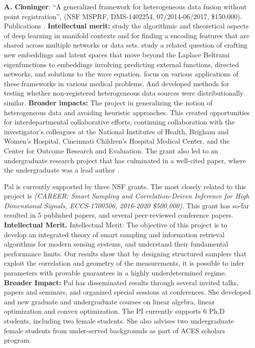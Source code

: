 {\bf A. Cloninger}: ``A generalized framework for heterogeneous data fusion without point registration'', (NSF MSPRF, DMS-1402254, 07/2014-06/2017, \$150,000). Publications \cite{mishne2017diffusion,cloninger2018bigeometric,shaham2018provable,cloninger2017spectral, cloninger2017note, cloninger2017prediction,cloninger2016function, downing2017describing, bates2017outcome, katzman2018deepsurv,cheng2017two,cloninger2018people}.
{\bf Intellectual merit:} \cite{mishne2017diffusion,cloninger2018bigeometric,shaham2018provable} study the algorithmic and theoretical aspects of deep learning in manifold contexts and for finding a encoding features that are shared across multiple networks or data sets.  \cite{cloninger2017spectral, cloninger2017note, cloninger2017prediction} study a related question of crafting new embeddings and latent spaces that move beyond the Laplace Beltrami eigenfunctions to embeddings involving predicting external functions, directed networks, and solutions to the wave equation.%
\cite{cloninger2016function, downing2017describing, bates2017outcome, katzman2018deepsurv} focus on various applications of these frameworks in various medical problems.  And \cite{cheng2017two,cloninger2018people} developed methods for testing whether non-registered heterogeneous data sources were distributionally similar.
{\bf Broader impacts:}
The project in generalizing the notion of heterogeneous data and avoiding heuristic approaches.  This created opportunities for interdepartmental collaborative efforts, continuing collaboration with the investigator's colleagues at the National Institutes of Health, Brigham and Women's Hospital, Cincinnati Children's Hospital Medical Center, and the Center for Outcome Research and Evaluation.  The grant also led to an undergraduate research project that has culminated in a well-cited paper, where the undergraduate was a lead author \cite{katzman2018deepsurv}.


 Pal is currently supported by three NSF grants. The most closely related to this project is {\em  (CAREER: Smart Sampling and Correlation-Driven Inference for High Dimensional Signals, ECCS-1700506, 2016-2020 \$500,000)}. This grant has so-far resulted in 5 published papers, and several peer-reviewed conference papers. {\bf Intellectual Merit.} Intellectual Merit: The objective of this project is to develop an integrated theory of smart sampling and information retrieval algorithms for modern sensing systems, and understand their fundamental performance limits. Our results show that by designing structured samplers that exploit the correlation and geometry of the measurements, it is possible to infer parameters with provable guarantees in a highly underdetermined regime. {\bf Broader Impact:} Pal has disseminated results through several invited talks, papers and seminars, and organized special sessions at conferences. She developed and new graduate and undergraduate courses on linear algebra, linear optimization and convex optimization. The PI currently supports 6 Ph.D students, including two female students. She also advises two undergraduate female students from under-served backgrounds as part of ACES scholars program. 

